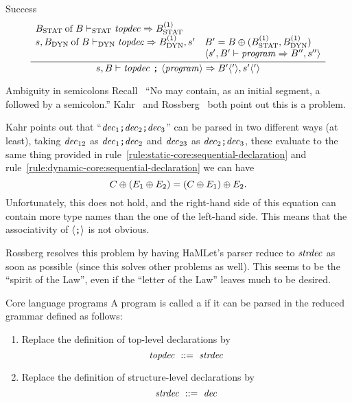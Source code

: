\begin{inference-rule}{Success}
\begin{equation}\label{rule:programs:success}
\vcenter{\infer{\s,\B\ts\longprog\ra\B'\optional{'},\s'\optional{'}}
  {\begin{array}{ll}
    \of{\Bstat}{\B}\tsstat\topdec\ra\Bstat^{(1)} & \\
    \s,\of{\Bdyn}{\B}\tsdyn\topdec\ra\Bdyn^{(1)},s'&
                \B'=\B\oplus(\Bstat^{(1)},\Bdyn^{(1)})\\
    &           \optional{\s',\B'\ts\program\ra\B'',s''}
   \end{array}}}
\end{equation}
\end{inference-rule}

\begin{remark}{Ambiguity in semicolons}
Recall~ ``No  may contain, as an initial segment, a
 followed by a semicolon.'' Kahr~\cite[]{kahrs1993mistakes}
and Rossberg~\cite{rossberg2018defects} both point out this is a problem.

Kahr points out that ``$\textit{dec\/}_{1}\texttt{;}\textit{dec\/}_{2}\texttt{;}\textit{dec\/}_{3}$''
can be parsed in two different ways (at least), taking $\textit{dec\/}_{12}$ as $\textit{dec\/}_{1}\texttt{;}\textit{dec\/}_{2}$
and $\textit{dec\/}_{23}$ as $\textit{dec\/}_{2}\texttt{;}\textit{dec\/}_{3}$, these evaluate to the
same thing provided in rule~\ref{rule:static-core:sequential-declaration}
and rule~\ref{rule:dynamic-core:sequential-declaration} we can have
\begin{equation*}
C\oplus(E_{1}\oplus E_{2})=(C\oplus E_{1})\oplus E_{2}.
\end{equation*}
Unfortunately, this does not hold, and the right-hand side of this
equation can contain more type names than the one of the left-hand side.
This means that the associativity of $\langle\texttt{;}\rangle$ is not obvious.

Rossberg resolves this problem by having HaMLet's parser reduce to
$\textit{strdec\/}$ as soon as possible (since this solves other problems as
well). This seems to be the ``spirit of the Law'', even if the ``letter
of the Law'' leaves much to be desired.
\end{remark}

\begin{definition}{Core language programs}
A program is called a  if it can be parsed
in the reduced grammar defined as follows:
\begin{enumerate}
\item Replace the definition of top-level declarations by
\begin{equation*}
\textit{topdec\/}\ ::=\ \textit{strdec\/}
\end{equation*}
\item Replace the definition of structure-level declarations by
\begin{equation*}
\textit{strdec\/}\ ::=\ \textit{dec\/}
\end{equation*}
\end{enumerate}
\end{definition}
